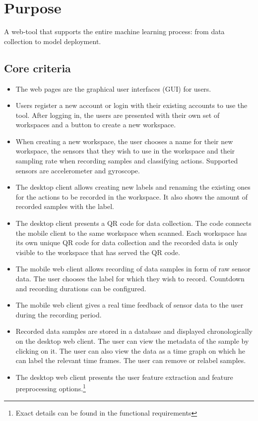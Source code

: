 \section{Purpose}
A web-tool that supports the entire machine learning process: from data collection to model deployment.

\subsection{Core criteria}
\begin{itemize}
    \item The web pages are the graphical user interfaces (GUI) for users.
    \item Users register a new account or login with their existing accounts to use the tool. After logging in, the users are presented with their own set of workspaces and a button to create a new workspace.
    \item When creating a new workspace, the user chooses a name for their new workspace, the sensors that they wish to use in the workspace and their sampling rate when recording samples and classifying actions. Supported sensors are accelerometer and gyroscope.
    \item The desktop client allows creating new labels and renaming the existing ones for the actions to be recorded in the workspace. It also shows the amount of recorded samples with the label. 
    \item The desktop client presents a QR code for data collection. The code connects the mobile client to the same \gls{workspace} when scanned. Each workspace has its own unique QR code for data collection and the recorded data is only visible to the workspace that has served the QR code.
    \item The mobile web client allows recording of data samples in form of raw sensor data. The user chooses the label for which they wish to record. Countdown and recording durations can be configured.
    \item The mobile web client gives a real time feedback of sensor data to the user during the recording period.
    \item Recorded data samples are stored in a database and displayed chronologically on the desktop web client. The user can view the metadata of the sample by clicking on it. The user can also view the data as a time graph on which he can label the relevant time frames. The user can remove or relabel samples.
    \item The desktop web client presents the user feature extraction and feature preprocessing options.\footnote{\label{exact}Exact details can be found in the functional requirements}

\end{itemize}
